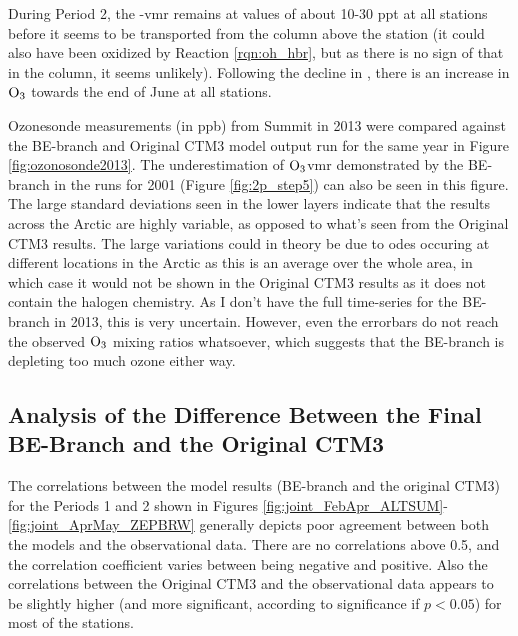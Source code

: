 During Period 2, the -\acrshort{vmr} remains at values of about 10-30 ppt at all stations before it seems to be transported from the column above the station (it could also have been oxidized by Reaction \ref{rqn:oh_hbr}, but as there is no sign of that in the  column, it seems unlikely). Following the decline in , there is an increase in $\mathrm{O_3}$ towards the end of June at all stations. 

\medskip

Ozonesonde measurements (in ppb) from Summit in 2013  were compared against the BE-branch and Original CTM3 model output run for the same year in Figure \ref{fig:ozonosonde2013}. The underestimation of $\mathrm{O_3}$\acrshort{vmr} demonstrated by the BE-branch in the runs for 2001 (Figure \ref{fig:2p_step5}) can also be seen in this figure. The large standard deviations seen in the lower layers indicate that the results across the Arctic are highly variable, as opposed to what's seen from the Original CTM3 results. The large variations could in theory be due to \acrshort{ode}s occuring at different locations in the Arctic as this is an average over the whole area, in which case it would not be shown in the Original CTM3 results as it does not contain the halogen chemistry. As I don't have the full time-series for the BE-branch in 2013, this is very uncertain. However, even the errorbars do not reach the observed $\mathrm{O_3}$ mixing ratios whatsoever, which suggests that the BE-branch is depleting too much ozone either way.


\subsection{Analysis of the Difference Between the Final BE-Branch and the Original CTM3}\label{sec:disc_origBE}

The correlations between the model results (BE-branch and the original CTM3) for the Periods 1 and 2 shown in Figures \ref{fig:joint_FebApr_ALTSUM}-\ref{fig:joint_AprMay_ZEPBRW} generally depicts poor agreement between both the models and the observational data. There are no correlations above 0.5, and the correlation coefficient varies between being negative and positive. Also the correlations between the Original CTM3 and the observational data appears to be slightly higher (and more significant, according to significance if $p<0.05$) for most of the stations. 

\medskip

